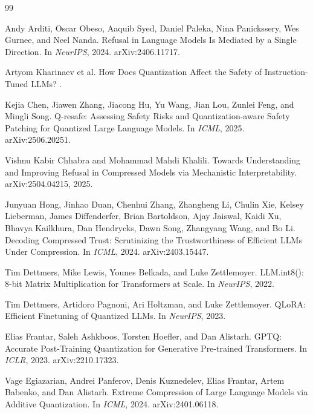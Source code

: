 \documentclass[11pt]{article}
\begin{document}

\begin{thebibliography}{99}

Andy Arditi, Oscar Obeso, Aaquib Syed, Daniel Paleka, Nina Panickssery, Wes Gurnee, and Neel Nanda.
\newblock Refusal in Language Models Is Mediated by a Single Direction.
\newblock In \emph{NeurIPS}, 2024. arXiv:2406.11717.

Artyom Kharinaev et al.
\newblock How Does Quantization Affect the Safety of Instruction-Tuned LLMs?
.

Kejia Chen, Jiawen Zhang, Jiacong Hu, Yu Wang, Jian Lou, Zunlei Feng, and Mingli Song.
\newblock Q-resafe: Assessing Safety Risks and Quantization-aware Safety Patching for Quantized Large Language Models.
\newblock In \emph{ICML}, 2025. arXiv:2506.20251.

Vishnu Kabir Chhabra and Mohammad Mahdi Khalili.
\newblock Towards Understanding and Improving Refusal in Compressed Models via Mechanistic Interpretability.
\newblock arXiv:2504.04215, 2025.

Junyuan Hong, Jinhao Duan, Chenhui Zhang, Zhangheng Li, Chulin Xie, Kelsey Lieberman, James Diffenderfer, Brian Bartoldson, Ajay Jaiswal, Kaidi Xu, Bhavya Kailkhura, Dan Hendrycks, Dawn Song, Zhangyang Wang, and Bo Li.
\newblock Decoding Compressed Trust: Scrutinizing the Trustworthiness of Efficient LLMs Under Compression.
\newblock In \emph{ICML}, 2024. arXiv:2403.15447.

Tim Dettmers, Mike Lewis, Younes Belkada, and Luke Zettlemoyer.
\newblock LLM.int8(): 8-bit Matrix Multiplication for Transformers at Scale.
\newblock In \emph{NeurIPS}, 2022.

Tim Dettmers, Artidoro Pagnoni, Ari Holtzman, and Luke Zettlemoyer.
\newblock QLoRA: Efficient Finetuning of Quantized LLMs.
\newblock In \emph{NeurIPS}, 2023.

Elias Frantar, Saleh Ashkboos, Torsten Hoefler, and Dan Alistarh.
\newblock GPTQ: Accurate Post-Training Quantization for Generative Pre-trained Transformers.
\newblock In \emph{ICLR}, 2023. arXiv:2210.17323.

Vage Egiazarian, Andrei Panferov, Denis Kuznedelev, Elias Frantar, Artem Babenko, and Dan Alistarh.
\newblock Extreme Compression of Large Language Models via Additive Quantization.
\newblock In \emph{ICML}, 2024. arXiv:2401.06118.


\end{thebibliography}
\end{document}
